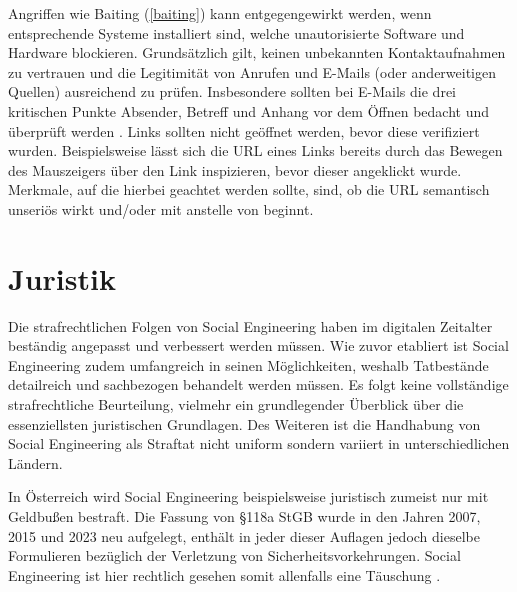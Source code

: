 Angriffen wie Baiting (\autoref{baiting}) kann entgegengewirkt werden, wenn entsprechende Systeme installiert sind, welche unautorisierte Software und Hardware blockieren.
Grundsätzlich gilt, keinen unbekannten Kontaktaufnahmen zu vertrauen  und die Legitimität von Anrufen und E-Mails (oder anderweitigen Quellen) ausreichend zu prüfen.
Insbesondere sollten bei E-Mails die drei kritischen Punkte Absender, Betreff und Anhang vor dem Öffnen bedacht und überprüft werden .
Links sollten nicht geöffnet werden, bevor diese verifiziert wurden. Beispielsweise lässt sich die URL eines Links bereits durch das Bewegen des Mauszeigers über den Link inspizieren, bevor dieser angeklickt wurde.
Merkmale, auf die hierbei geachtet werden sollte, sind, ob die URL semantisch unseriös wirkt und/oder mit  anstelle von  beginnt. 

\section{Juristik}

Die strafrechtlichen Folgen von Social Engineering haben im digitalen Zeitalter beständig angepasst und verbessert werden müssen.
Wie zuvor etabliert ist Social Engineering zudem umfangreich in seinen Möglichkeiten, weshalb Tatbestände detailreich und sachbezogen behandelt werden müssen.
Es folgt keine vollständige strafrechtliche Beurteilung, vielmehr ein grundlegender Überblick über die essenziellsten juristischen Grundlagen.
Des Weiteren ist die Handhabung von Social Engineering als Straftat nicht uniform sondern variiert in unterschiedlichen Ländern.

In Österreich wird Social Engineering beispielsweise juristisch zumeist nur mit Geldbußen bestraft.
Die Fassung von §118a StGB wurde in den Jahren 2007, 2015 und 2023 neu aufgelegt, enthält in jeder dieser Auflagen jedoch dieselbe Formulieren bezüglich der Verletzung von Sicherheitsvorkehrungen.
Social Engineering ist hier rechtlich gesehen somit allenfalls eine Täuschung .

